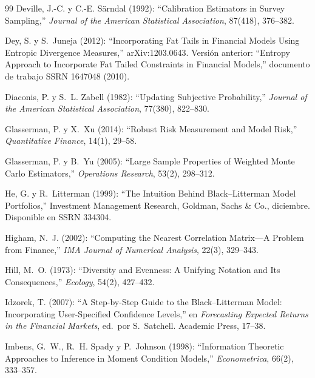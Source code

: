 \documentclass[11pt]{article}
\begin{document}
\begin{thebibliography}{99}
Deville, J.-C. y C.-E. S\"arndal (1992): ``Calibration Estimators in
Survey Sampling,'' \textit{Journal of the American Statistical
Association}, 87(418), 376--382.

Dey, S. y S.~Juneja (2012): ``Incorporating Fat Tails in Financial Models
Using Entropic Divergence Measures,'' arXiv:1203.0643. Versi\'on anterior:
``Entropy Approach to Incorporate Fat Tailed Constraints in Financial
Models,'' documento de trabajo SSRN 1647048 (2010).

Diaconis, P. y S.~L. Zabell (1982): ``Updating Subjective
Probability,'' \textit{Journal of the American Statistical Association},
77(380), 822--830.

Glasserman, P. y X.~Xu (2014): ``Robust Risk Measurement and Model Risk,''
\textit{Quantitative Finance}, 14(1), 29--58.

Glasserman, P. y B.~Yu (2005): ``Large Sample Properties of Weighted Monte
Carlo Estimators,'' \textit{Operations Research}, 53(2), 298--312.

He, G. y R.~Litterman (1999): ``The Intuition Behind Black--Litterman
Model Portfolios,'' Investment Management Research, Goldman, Sachs \& Co.,
diciembre. Disponible en SSRN 334304.

Higham, N.~J. (2002): ``Computing the Nearest Correlation Matrix---A
Problem from Finance,'' \textit{IMA Journal of Numerical Analysis}, 22(3),
329--343.

Hill, M.~O. (1973): ``Diversity and Evenness: A Unifying Notation and Its
Consequences,'' \textit{Ecology}, 54(2), 427--432.

Idzorek, T. (2007): ``A Step-by-Step Guide to the Black--Litterman Model: Incorporating
User-Specified Confidence Levels,''
en \textit{Forecasting Expected Returns in the Financial Markets}, ed.\ por
S.~Satchell. Academic Press, 17--38.

Imbens, G.~W., R.~H. Spady y P.~Johnson (1998): ``Information Theoretic
Approaches to Inference in Moment Condition Models,'' \textit{Econometrica},
66(2), 333--357.


\end{thebibliography}
\end{document}
